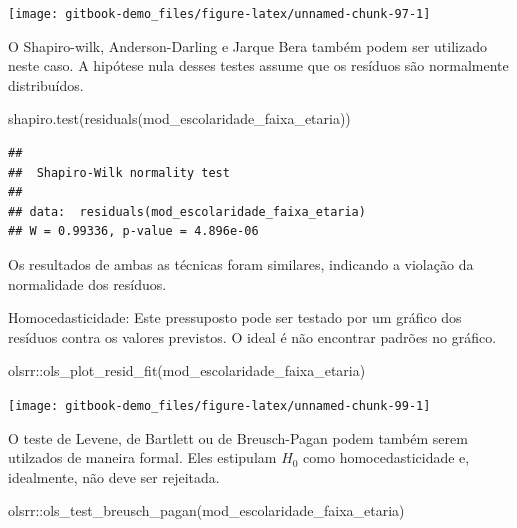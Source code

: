 \documentclass[
]{book}
\newenvironment{Shaded}{\begin{snugshade}}{\end{snugshade}}
\newcommand{\FunctionTok}[1]{\textcolor[rgb]{0.00,0.00,0.00}{#1}}
\newcommand{\NormalTok}[1]{#1}
\newcommand{\SpecialCharTok}[1]{\textcolor[rgb]{0.00,0.00,0.00}{#1}}
\begin{document}
\begin{center}\texttt{[image: gitbook-demo\_files/figure-latex/unnamed-chunk-97-1]} \end{center}

O Shapiro-wilk, Anderson-Darling e Jarque Bera também podem ser utilizado neste caso. A hipótese nula desses testes assume que os resíduos são normalmente distribuídos.

\begin{Shaded}
\begin{Highlighting}[]
\FunctionTok{shapiro.test}\NormalTok{(}\FunctionTok{residuals}\NormalTok{(mod\_escolaridade\_faixa\_etaria))}
\end{Highlighting}
\end{Shaded}

\begin{verbatim}
## 
##  Shapiro-Wilk normality test
## 
## data:  residuals(mod_escolaridade_faixa_etaria)
## W = 0.99336, p-value = 4.896e-06
\end{verbatim}

Os resultados de ambas as técnicas foram similares, indicando a violação da normalidade dos resíduos.

Homocedasticidade: Este pressuposto pode ser testado por um gráfico dos resíduos contra os valores previstos. O ideal é não encontrar padrões no gráfico.

\begin{Shaded}
\begin{Highlighting}[]
\NormalTok{olsrr}\SpecialCharTok{::}\FunctionTok{ols\_plot\_resid\_fit}\NormalTok{(mod\_escolaridade\_faixa\_etaria)}
\end{Highlighting}
\end{Shaded}

\begin{center}\texttt{[image: gitbook-demo\_files/figure-latex/unnamed-chunk-99-1]} \end{center}

O teste de Levene, de Bartlett ou de Breusch-Pagan podem também serem utilzados de maneira formal. Eles estipulam \(H_0\) como homocedasticidade e, idealmente, não deve ser rejeitada.

\begin{Shaded}
\begin{Highlighting}[]
\NormalTok{olsrr}\SpecialCharTok{::}\FunctionTok{ols\_test\_breusch\_pagan}\NormalTok{(mod\_escolaridade\_faixa\_etaria)}
\end{Highlighting}
\end{Shaded}
\end{document}
